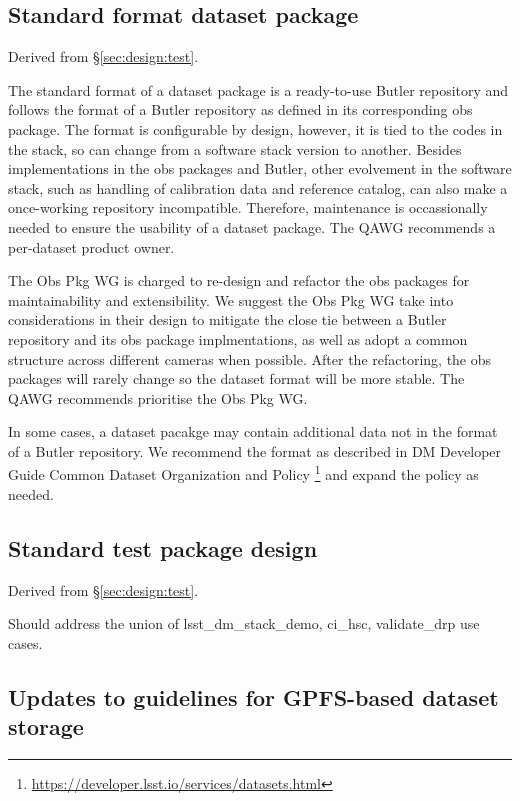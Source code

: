 \subsection{Standard format dataset package}
\label{sec:comp:lfs-dataset}

Derived from \S\ref{sec:design:test}.


The standard format of a dataset package is a ready-to-use Butler
repository and follows the format of a Butler repository as defined
in its corresponding obs package.  The format is configurable by
design, however, it is tied to the codes in the stack, so can change
from a software stack version to another.  Besides implementations
in the obs packages and Butler, other evolvement in the software
stack, such as handling of calibration data and reference catalog,
can also make a once-working repository incompatible.  Therefore,
maintenance is occassionally needed to ensure the usability of a
dataset package.  The QAWG recommends a per-dataset product owner.

The Obs Pkg WG  is charged to re-design and refactor
the obs packages for maintainability and extensibility. We suggest
the Obs Pkg WG take into considerations in their design to mitigate
the close tie between a Butler repository and its obs package
implmentations, as well as adopt a common structure across different
cameras when possible.  After the refactoring, the obs packages
will rarely change so the dataset format will be more stable.  The
QAWG recommends prioritise the Obs Pkg WG.

In some cases, a dataset pacakge may contain additional data not
in the format of a Butler repository. We recommend the format as
described in DM Developer Guide Common Dataset Organization and
Policy \footnote{\url{https://developer.lsst.io/services/datasets.html}}
and expand the policy as needed.

\subsection{Standard test package design}

Derived from \S\ref{sec:design:test}.


Should address the union of lsst\_dm\_stack\_demo, ci\_hsc, validate\_drp use
cases.

\subsection{Updates to guidelines for GPFS-based dataset storage}
\label{sec:comp:gpfs-dataset}

